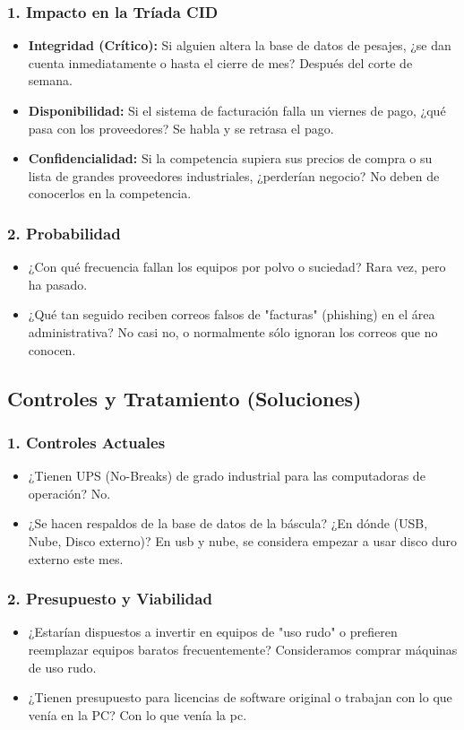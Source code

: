\subsubsection{1. Impacto en la Tríada CID}
\begin{itemize}
    \item \textbf{Integridad (Crítico):} Si alguien altera la base de datos de pesajes, ¿se dan cuenta inmediatamente o hasta el cierre de mes? Después del corte de semana.
    \item \textbf{Disponibilidad:} Si el sistema de facturación falla un viernes de pago, ¿qué pasa con los proveedores? Se habla y se retrasa el pago.
    \item \textbf{Confidencialidad:} Si la competencia supiera sus precios de compra o su lista de grandes proveedores industriales, ¿perderían negocio? No deben de conocerlos en la competencia.
\end{itemize}
\subsubsection{2. Probabilidad}
\begin{itemize}
    \item ¿Con qué frecuencia fallan los equipos por polvo o suciedad? Rara vez, pero ha pasado.
    \item ¿Qué tan seguido reciben correos falsos de "facturas" (phishing) en el área administrativa? No casi no, o normalmente sólo ignoran los correos que no conocen.
\end{itemize}

\subsection{Controles y Tratamiento (Soluciones)}
\subsubsection{1. Controles Actuales}
\begin{itemize}
    \item ¿Tienen UPS (No-Breaks) de grado industrial para las computadoras de operación? No.
    \item ¿Se hacen respaldos de la base de datos de la báscula? ¿En dónde (USB, Nube, Disco externo)? En usb y nube, se considera empezar a usar disco duro externo este mes.
\end{itemize}
\subsubsection{2. Presupuesto y Viabilidad}
\begin{itemize}
    \item ¿Estarían dispuestos a invertir en equipos de "uso rudo" o prefieren reemplazar equipos baratos frecuentemente? Consideramos comprar máquinas de uso rudo.
    \item ¿Tienen presupuesto para licencias de software original o trabajan con lo que venía en la PC? Con lo que venía la pc.
\end{itemize}

